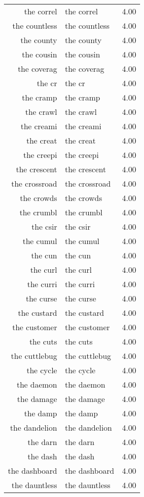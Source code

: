 \begin{table}[ht]
\begin{tabular}{rlr}
  the correl & the correl & 4.00 \\ 
  the countless & the countless & 4.00 \\ 
  the county & the county & 4.00 \\ 
  the cousin & the cousin & 4.00 \\ 
  the coverag & the coverag & 4.00 \\ 
  the cr & the cr & 4.00 \\ 
  the cramp & the cramp & 4.00 \\ 
  the crawl & the crawl & 4.00 \\ 
  the creami & the creami & 4.00 \\ 
  the creat & the creat & 4.00 \\ 
  the creepi & the creepi & 4.00 \\ 
  the crescent & the crescent & 4.00 \\ 
  the crossroad & the crossroad & 4.00 \\ 
  the crowds & the crowds & 4.00 \\ 
  the crumbl & the crumbl & 4.00 \\ 
  the csir & the csir & 4.00 \\ 
  the cumul & the cumul & 4.00 \\ 
  the cun & the cun & 4.00 \\ 
  the curl & the curl & 4.00 \\ 
  the curri & the curri & 4.00 \\ 
  the curse & the curse & 4.00 \\ 
  the custard & the custard & 4.00 \\ 
  the customer & the customer & 4.00 \\ 
  the cuts & the cuts & 4.00 \\ 
  the cuttlebug & the cuttlebug & 4.00 \\ 
  the cycle & the cycle & 4.00 \\ 
  the daemon & the daemon & 4.00 \\ 
  the damage & the damage & 4.00 \\ 
  the damp & the damp & 4.00 \\ 
  the dandelion & the dandelion & 4.00 \\ 
  the darn & the darn & 4.00 \\ 
  the dash & the dash & 4.00 \\ 
  the dashboard & the dashboard & 4.00 \\ 
  the dauntless & the dauntless & 4.00 \\ 

\end{tabular}
\end{table}
